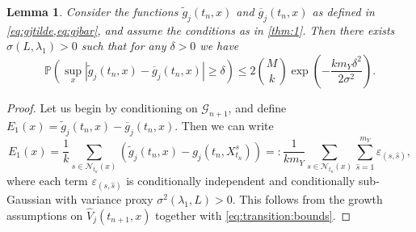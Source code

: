 \documentclass[11pt,reqno,a4paper]{amsart}
\newtheorem{lemma}[theorem]{Lemma}
\theoremstyle{definition}
\numberwithin{equation}{section}
\newcommand{\widebar}[1]{\overline{#1}}
\renewcommand{\P}{\mathbb{P}}
\DeclareMathOperator{\1}{\mathbbm{1}}
\begin{document}
\begin{lemma} \label{lemma:gjtilde:gjbar}
  Consider the functions $\widetilde{g}_j(t_n,x)$ and $\widebar{g}_j(t_n,x)$ as defined in \cref{eq:gjtilde,eq:gjbar}, and assume the conditions as in \cref{thm:1}.
  Then there exists $\sigma(L, \lambda_1) > 0$ such that for any $\delta > 0$ we have
  \begin{equation*}
    \P \left (\sup_{x} |\widetilde{g}_j(t_n,x) - \widebar{g}_j(t_n,x)| \geq \delta \right ) \leq
    2{\binom{M}{k}} \exp \left (-\frac{k m_Y\delta^2}{2 \sigma^2} \right ).
  \end{equation*}
\end{lemma}
\begin{proof}
  Let us begin by conditioning on $\mathcal{G}_{n+1}$, and define $E_1(x) = \widetilde{g}_j(t_n,x) - \widebar{g}_j(t_n,x)$. Then we can write
  \begin{equation*}
    E_1(x) = \frac{1}{k} \sum_{s \in \mathcal{N}_{t_n}(x)} \left (\widetilde{g}_j(t_n,x) - g_j(t_n,X_{t_n}^{s}) \right ) =: \frac{1}{k m_Y} \sum_{s \in \mathcal{N}_{t_n}(x)} \sum_{\hat s=1}^{m_Y} \varepsilon_{(s,\hat s)},
  \end{equation*}
  where each term $\varepsilon_{(s,\hat s)}$ is conditionally independent and conditionally sub-Gaussian with variance proxy $\sigma^2(\lambda_1, L) > 0$. This follows from the growth assumptions on $\widehat{V}_j(t_{n+1},x)$ together with \cref{eq:transition:bounds}.


\end{proof}
\end{document}
